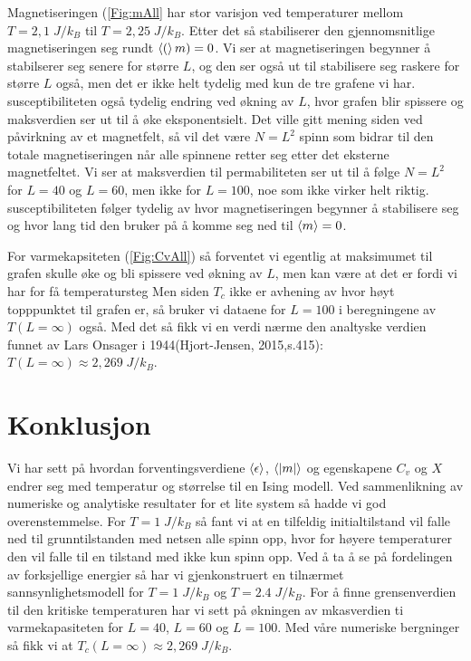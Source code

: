 \documentclass[reprint,english,notitlepage]{revtex4-2}  %
\begin{document}
Magnetiseringen (\autoref{Fig:mAll} har stor varisjon ved temperaturer mellom $T = 2,1 \; J/k_B$ til $T = 2,25 \; J/k_B$. Etter det så stabiliserer den gjennomsnitlige magnetiseringen seg rundt $ \expval(m) = 0$. Vi ser at magnetiseringen begynner å stabilserer seg senere for større $L$, og den ser også ut til stabilisere seg raskere for større $L$ også, men det er ikke helt tydelig med kun de tre grafene vi har. susceptibiliteten også tydelig endring ved økning av $L$, hvor grafen blir spissere og maksverdien ser ut til å øke eksponentsielt. Det ville gitt mening siden ved påvirkning av et magnetfelt, så vil det være $N = L^2$ spinn som bidrar til den totale magnetiseringen når alle spinnene retter seg etter det eksterne magnetfeltet. Vi ser at maksverdien til permabiliteten ser ut til å følge $N = L^2$ for $L = 40$ og $L = 60$, men ikke for $L = 100$, noe som ikke virker helt riktig. susceptibiliteten følger tydelig av hvor magnetiseringen begynner å stabilisere seg og hvor lang tid den bruker på å komme seg ned til $\expval{m} = 0$.

For varmekapsiteten (\autoref{Fig:CvAll}) så forventet vi egentlig at maksimumet til grafen skulle øke og bli spissere ved økning av $L$, men kan være at det er fordi vi har for få temperatursteg  Men siden  $T_c$ ikke er avhening av hvor høyt topppunktet til grafen er, så bruker vi dataene for $L = 100$ i beregningene av $T \left ( L = \infty \right ) $ også. Med det så fikk vi en verdi nærme den analtyske verdien funnet av Lars Onsager i 1944(Hjort-Jensen, 2015,s.415): $T \left ( L = \infty \right ) \approx 2,269 \; J/k_B$.


\section{Konklusjon}

Vi har sett på hvordan forventingsverdiene $\expval{\epsilon}$, $\expval{|m|}$ og egenskapene $C_v$ og $X$ endrer seg med temperatur og størrelse til en Ising modell. Ved sammenlikning av numeriske og analytiske resultater for et lite system så hadde vi god overenstemmelse. For $T = 1 \; J/k_B$ så fant vi at en tilfeldig initialtilstand vil falle ned til grunntilstanden med netsen alle spinn opp, hvor for høyere temperaturer den vil falle til en tilstand med ikke kun spinn opp. Ved å ta å se på fordelingen av forksjellige energier så har vi gjenkonstruert en tilnærmet sannsynlighetsmodell for $T = 1 \; J/k_B$ og $T = 2.4 \; J/k_B$. For å finne grensenverdien til den kritiske temperaturen har vi sett på økningen av mkasverdien ti varmekapasiteten for $L = 40$, $L = 60$ og $L=100$. Med våre numeriske bergninger så fikk vi at $T_c \left (L = \infty \right ) \approx 2,269 \; J/k_B$.
\end{document}
